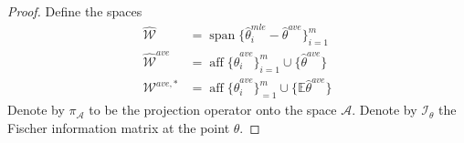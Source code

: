 \documentclass[twoside]{article}
\newtheorem{lemma}{Lemma}
\DeclareMathOperator*{\vecspan}{span}
\DeclareMathOperator*{\affspan}{aff}
\newcommand{\W}{\mathcal{\hat W}}
\newcommand{\Wave}{{\mathcal{\hat W}^{ave}}}
\newcommand{\Wtave}{{\mathcal{W}^{ave,*}}}
\newcommand{\A}{\mathcal{A}}
\newcommand{\E}{\mathbb{E}}
\newcommand{\x}{\mathbf{x}}
\newcommand{\w}{\theta}
\newcommand{\wave}{\hat\w^{ave}}
\newcommand{\wtave}{\E\hat\w^{ave}}
\newcommand{\wmle}{\hat\w^{mle}}
\newcommand{\I}{\mathcal I}
\newcommand{\ltwo}[1]{{\left\lVert {#1} \right\rVert}}
\newcommand{\proj}[1]{\pi_{{#1}}}
\newcommand{\prob}[1]{\Pr\left[{#1}\right]}
\begin{document}
\begin{proof}
{Define the spaces
\begin{align}
\W&=\vecspan\{\wmle_i - \wave\}_{i=1}^m\\
\Wave&=\affspan\{\wave_i\}_{i=1}^m\cup\{\wave\}\\
\Wtave&=\affspan\{\wave_i\}_{=1}^m\cup\{\wtave\}
\end{align}
Denote by $\proj\A$ to be the projection operator onto the space $\A$.
Denote by $\I_\w$ the Fischer information matrix at the point $\w$.


}
\end{proof}
\end{document}
